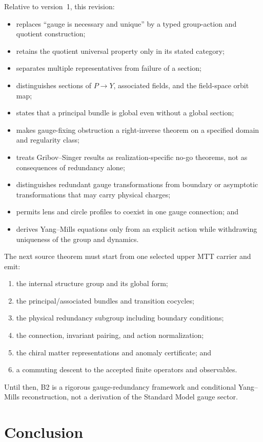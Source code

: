 \documentclass[11pt]{article}
\begin{document}
Relative to version~1, this revision:
\begin{itemize}
\item replaces ``gauge is necessary and unique'' by a typed group-action and
quotient construction;
\item retains the quotient universal property only in its stated category;
\item separates multiple representatives from failure of a section;
\item distinguishes sections of $P\to Y$, associated fields, and the
field-space orbit map;
\item states that a principal bundle is global even without a global section;
\item makes gauge-fixing obstruction a right-inverse theorem on a specified
domain and regularity class;
\item treats Gribov--Singer results as realization-specific no-go theorems,
not as consequences of redundancy alone;
\item distinguishes redundant gauge transformations from boundary or
asymptotic transformations that may carry physical charges;
\item permits lens and circle profiles to coexist in one gauge connection;
and
\item derives Yang--Mills equations only from an explicit action while
withdrawing uniqueness of the group and dynamics.
\end{itemize}

The next source theorem must start from one selected upper MTT carrier and emit:
\begin{enumerate}
\item the internal structure group and its global form;
\item the principal/associated bundles and transition cocycles;
\item the physical redundancy subgroup including boundary conditions;
\item the connection, invariant pairing, and action normalization;
\item the chiral matter representations and anomaly certificate; and
\item a commuting descent to the accepted finite operators and observables.
\end{enumerate}
Until then, B2 is a rigorous gauge-redundancy framework and conditional
Yang--Mills reconstruction, not a derivation of the Standard Model gauge
sector.

\section{Conclusion}
\end{document}
